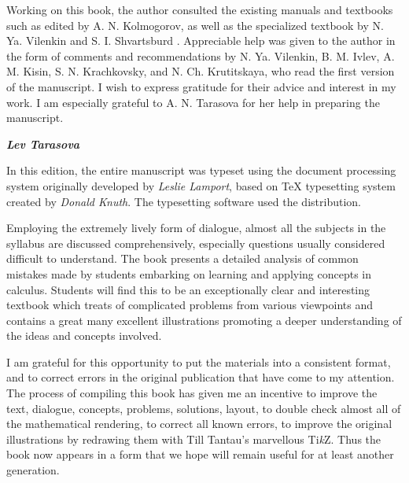\hspace{5mm}\textcolor{shadow}{Working on this book, the author consulted the existing manuals and textbooks such as  edited by A. N. Kolmogorov, as well as the specialized textbook by N. Ya. Vilenkin and S. I. Shvartsburd . Appreciable help was given to the author in the form of comments and recommendations by N. Ya. Vilenkin, B. M. Ivlev, A. M. Kisin, S. N. Krachkovsky, and N. Ch. Krutitskaya, who read the first version of the manuscript. I wish to express gratitude for their advice and interest in my  work. I am especially grateful to A. N. Tarasova for her help in preparing the manuscript.}

\vspace{0.2in}

 \hfill \emph{\color{Sepia} \textbf{Lev Tarasova}}

\vspace{0.2in}

\thispagestyle{empty}

\hspace{5mm}\textcolor{shadow}{In this edition, the entire manuscript was typeset using the \LaTeXe{} document processing system originally developed by \emph{Leslie Lamport}, based on \TeX{} typesetting system created by \emph{Donald Knuth}. The typesetting software used the  distribution.}

\hspace{5mm}\textcolor{shadow}{Employing the extremely lively form of dialogue, almost all the subjects in the syllabus are discussed comprehensively, especially questions usually considered difficult to understand. The book presents a detailed analysis of common mistakes made by students embarking on learning and applying concepts in calculus. Students will find this to be an exceptionally clear and interesting textbook which treats of  complicated problems from various viewpoints and contains a great many excellent illustrations promoting a deeper  understanding of the ideas and concepts involved.}

\hspace{5mm}\textcolor{shadow}{I am grateful for this opportunity to put the materials into a consistent format, and to correct errors in the original publication that have come to my attention. The process of compiling this book has given me an incentive to improve the text, dialogue, concepts, problems, solutions, layout, to double check almost all of the mathematical rendering, to correct all known errors, to improve the original illustrations by redrawing them with Till Tantau's marvellous \textup{Ti\textit{k}Z}. Thus the book now appears in a form that we hope will remain useful for at least another generation.}


